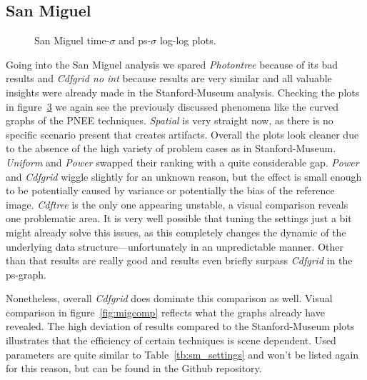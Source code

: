 \FloatBarrier
\subsection{San Miguel}

\begin{figure}
    \centering
    \begin{subfigure}{.5\textwidth}
      \centering
        \caption{}
        \label{fig:sanmain_t}
    \end{subfigure}%
    \begin{subfigure}{.5\textwidth}
        \caption{}
        \label{fig:sanmain_ps}
    \end{subfigure}
    \caption{San Miguel time-$\sigma$ and ps-$\sigma$ log-log plots.}
    \label{fig:sanmain}
\end{figure}

Going into the San Miguel analysis we spared \textit{Photontree} because of its bad results and \textit{Cdfgrid no int} because results are very similar and all valuable insights were already made in the Stanford-Museum analysis. Checking the plots in figure~\ref{fig:sanmain} we again see the previously discussed phenomena like the curved graphs of the PNEE techniques. \textit{Spatial} is very straight now, as there is no specific scenario present that creates artifacts. Overall the plots look cleaner due to the absence of the high variety of problem cases as in Stanford-Museum. \textit{Uniform} and \textit{Power} swapped their ranking with a quite considerable gap. \textit{Power} and \textit{Cdfgrid} wiggle slightly for an unknown reason, but the effect is small enough to be potentially caused by variance or potentially the bias of the reference image. \textit{Cdftree} is the only one appearing unstable, a visual comparison reveals one problematic area. It is very well possible that tuning the settings just a bit might already solve this issues, as this completely changes the dynamic of the underlying data structure---unfortunately in an unpredictable manner. Other than that results are really good and results even briefly surpass \textit{Cdfgrid} in the ps-graph. 

Nonetheless, overall \textit{Cdfgrid} does dominate this comparison as well. Visual comparison in figure~\ref{fig:migcomp} reflects what the graphs already have revealed. The high deviation of results compared to the Stanford-Museum plots illustrates that the efficiency of certain techniques is scene dependent. Used parameters are quite similar to Table~\ref{tb:sm_settings} and won't be listed again for this reason, but can be found in the Github repository.


